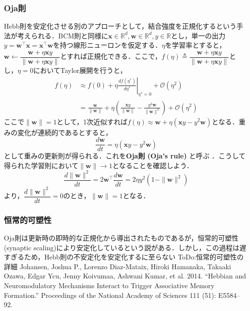 \subsubsection{Oja則}
Hebb則を安定化させる別のアプローチとして，結合強度を正規化するという手法が考えられる．BCM則と同様に$\mathbf{x}\in \mathbb{R}^d, \mathbf{w}\in \mathbb{R}^d, y\in \mathbb{R}$とし，単一の出力$y = \mathbf{w}^\top \mathbf{x}=\mathbf{x}^\top \mathbf{w}$を持つ線形ニューロンを仮定する．$\eta$を学習率とすると，$\mathbf{w}\leftarrow\dfrac{\mathbf{w}+\eta \mathbf{x}y}{\|\mathbf{w}+\eta \mathbf{x}y\|}$とすれば正規化できる．ここで，$f(\eta)\triangleq\dfrac{\mathbf{w}+\eta \mathbf{x}y}{\|\mathbf{w}+\eta \mathbf{x}y\|}$とし，$\eta=0$においてTaylor展開を行うと，
\begin{align}
f(\eta)&\approx f(0) + \eta \left.\frac{df(\eta^*)}{d\eta^*}\right|_{\eta^*=0} + \mathcal{O}(\eta^2)\\
&=\frac{\mathbf{w}}{\|\mathbf{w}\|} + \eta \left(\frac{\mathbf{x}y}{\|\mathbf{w}\|}-\frac{y^2\mathbf{w}}{\|\mathbf{w}\|^3}\right)+ \mathcal{O}(\eta^2)
\end{align}
ここで$\|\mathbf{w}\|=1$として，1次近似すれば$f(\eta)\approx \mathbf{w} + \eta \left(\mathbf{x}y-y^2 \mathbf{w}\right)$となる．重みの変化が連続的であるとすると，
\begin{equation}
\frac{d\mathbf{w}}{dt} = \eta \left(\mathbf{x}y-y^2 \mathbf{w}\right)
\end{equation}
として重みの更新則が得られる．これを\textbf{Oja則 (Oja's rule)} と呼ぶ \citep{Oja1982-yd}．こうして得られた学習則において$\|\mathbf{w}\|\to 1$となることを確認しよう．
\begin{equation}
\frac{d\|\mathbf{w}\|^2}{dt}=2\mathbf{w}^\top\frac{d\mathbf{w}}{dt}= 2\eta y^2\left(1-\|\mathbf{w}\|^2\right)
\end{equation}
より，$\dfrac{d\|\mathbf{w}\|^2}{dt}=0$のとき，$\|\mathbf{w}\|= 1$となる．
\subsubsection{恒常的可塑性}
Oja則は更新時の即時的な正規化から導出されたものであるが，恒常的可塑性 (synaptic scaling)により安定化しているという説がある\citep{Turrigiano2008-lm}\citep{Yee2017-fb}．しかし，この過程は遅すぎるため，Hebb則の不安定化を安定化するに至らない\citep{Zenke2017-el}
ToDo:恒常的可塑性の詳細
Johansen, Joshua P., Lorenzo Diaz-Mataix, Hiroki Hamanaka, Takaaki Ozawa, Edgar Ycu, Jenny Koivumaa, Ashwani Kumar, et al. 2014. “Hebbian and Neuromodulatory Mechanisms Interact to Trigger Associative Memory Formation.” Proceedings of the National Academy of Sciences 111 (51): E5584–92.
